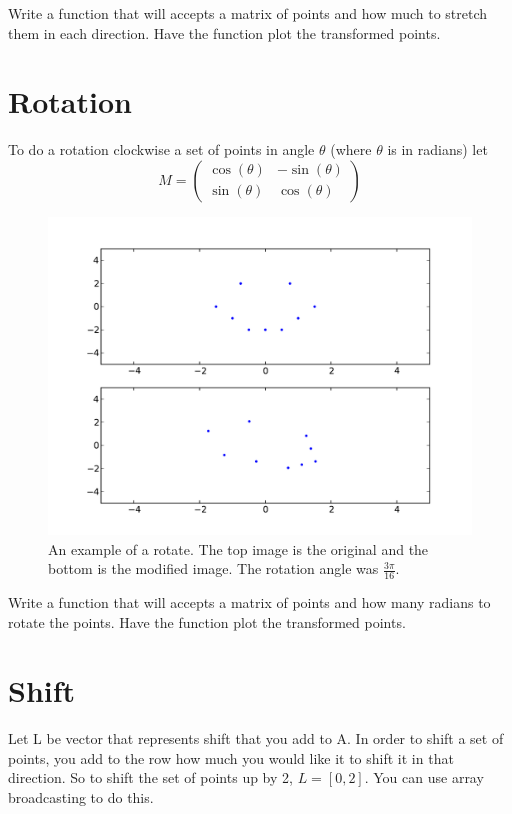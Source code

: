 \begin{problem}
Write a function that will accepts a matrix of points and how much to stretch them in each direction.
Have the function plot the transformed points.
\end{problem}

\section*{Rotation}
To do a rotation clockwise a set of points in angle $\theta$ (where $\theta$ is in radians) let
\[
M = \begin{pmatrix}
\cos(\theta) & -\sin(\theta) \\
\sin(\theta) & \cos(\theta) 
\end{pmatrix}
\]

\begin{figure}[H]
\includegraphics[scale = .5]{rotate.pdf}
\caption{
An example of a rotate.
The top image is the original and the bottom is the modified image.
The rotation angle was $\frac{3\pi}{16}$.}
\end{figure}

\begin{problem}
Write a function that will accepts a matrix of points and how many radians to rotate the points.
Have the function plot the transformed points.
\end{problem}

\section*{Shift}
Let L be vector that represents shift that you add to A.
In order to shift a set of points, you add to the row how much you would like it to shift it in that direction.
So to shift the set of points up by 2, $L=[0,2]$.
You can use array broadcasting to do this.

